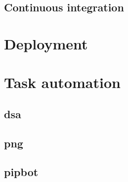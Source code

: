 
\subsection{Continuous integration}

\lipsum[18-26]


\section{Deployment}

\lipsum[12-24]


\section{Task automation}

\lipsum[50]

\subsection{dsa}

\lipsum[35-42]

\subsection{png}

\lipsum[40-48]

\subsection{pipbot}

\lipsum[35-47]
